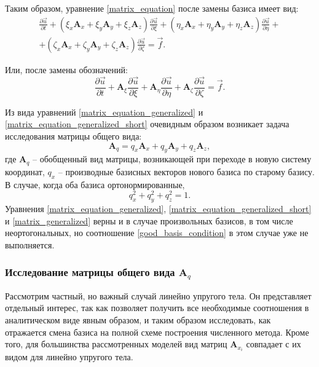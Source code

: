 Таким образом, уравнение \ref{matrix_equation} после замены базиса имеет вид:
\begin{align}
\label{matrix_equation_generalized}
\frac{\partial\vec{u}}{\partial{t}} + 
( \xi_x \mathbf{A}_x  + \xi_y \mathbf{A}_y + \xi_z \mathbf{A}_z ) \frac{\partial\vec{u}}{\partial{\xi}} + 
( \eta_x \mathbf{A}_x + \eta_y \mathbf{A}_y + \eta_z \mathbf{A}_z ) \frac{\partial\vec{u}}{\partial{\eta}} + \nonumber\\
+ ( \zeta_x \mathbf{A}_x  + \zeta_y \mathbf{A}_y + \zeta_z \mathbf{A}_z ) \frac{\partial\vec{u}}{\partial{\zeta}} = \vec f.
\end{align}

Или, после замены обозначений:
\begin{equation}
\label{matrix_equation_generalized_short}
\frac{\partial\vec{u}}{\partial{t}} + \mathbf{A}_\xi \frac{\partial\vec{u}}{\partial{\xi}} + 
\mathbf{A}_\eta \frac{\partial\vec{u}}{\partial{\eta}} + \mathbf{A}_\zeta \frac{\partial\vec{u}}{\partial{\zeta}} = \vec f.
\end{equation}

Из вида уравнений \ref{matrix_equation_generalized} и \ref{matrix_equation_generalized_short} очевидным образом возникает задача исследования матрицы общего вида:
\begin{equation}
\label{matrix_generalized}
\mathbf{A}_q = q_x \mathbf{A}_x  + q_y \mathbf{A}_y + q_z \mathbf{A}_z,
\end{equation}
где $\mathbf{A}_q$ -- обобщенный вид матрицы, возникающей при переходе в новую систему координат, $q_x$ -- производные базисных векторов нового базиса по старому базису. В случае, когда оба базиса ортонормированные,
\begin{equation}
\label{good_basis_condition}
q_x^2 + q_y^2 + q_z^2 = 1.
\end{equation}
Уравнения \ref{matrix_equation_generalized}, \ref{matrix_equation_generalized_short} и \ref{matrix_generalized} верны и в случае произвольных базисов, в том числе неортогональных, но соотношение \ref{good_basis_condition} в этом случае уже не выполняется.

\subsubsection{Исследование матрицы общего вида $\mathbf{A}_q$}

Рассмотрим частный, но важный случай линейно упругого тела. Он представляет отдельный интерес, так как позволяет получить все необходимые соотношения в аналитическом виде явным образом, и таким образом исследовать, как отражается смена базиса на полной схеме построения численного метода. Кроме того, для большинства рассмотренных моделей вид матриц $\mathbf A_{x_i}$ совпадает с их видом для линейно упругого тела.

